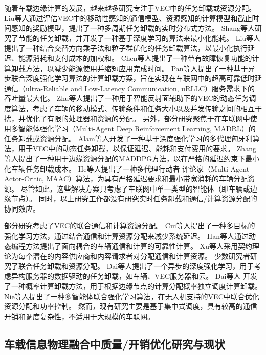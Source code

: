 随着车载边缘计算的发展，越来越多研究专注于VEC中的任务卸载或资源分配。
Liu等人\cite{liu2021rtds}通过评估VEC中的移动性感知的通信模型、资源感知的计算模型和截止时间感知的奖励模型，提出了一种多周期任务卸载的实时分布式方法。
Shang等人\cite{shang2021deep}研究了节能的任务卸载，并开发了一种基于深度学习的算法来最小化能耗。
Liu等人\cite{liu2022a}提出了一种结合交替方向乘子法和粒子群优化的任务卸载算法，以最小化执行延迟、能源消耗和支付成本的加权和。
Chen等人\cite{chen2020robust}提出了一种带有故障恢复功能的计算卸载方法，以减少能源使用并缩短应用完成时间。
Pan等人\cite{pan2022asynchronous}提出了一种基于异步联合深度强化学习算法的计算卸载方案，旨在实现在车联网中的超高可靠低时延通信（ultra-Reliable and Low-Latency Communication, uRLLC）服务需求下的吞吐量最大化。
Zhu等人\cite{zhu2022a}提出了一种用于智能反射面辅助下的VEC的动态任务调度算法，考虑了车辆的移动模式、传输条件和任务大小以及并发传输之间的相互干扰，并优化了有限的处理器和资源的分配。
另外，部分研究聚焦于在车联网中使用多智能体强化学习（Multi-Agent Deep Reinforcement Learning, MADRL）\cite{althamary2019a}的任务卸载或资源分配。
Alam等人\cite{alam2022multi}开发了一种基于深度强化学习的多代理匈牙利算法，用于VEC中的动态任务卸载，以保证延迟、能耗和支付费用的要求。
Zhang等人\cite{zhang2021adaptive}提出了一种用于边缘资源分配的MADDPG方法，以在严格的延迟约束下最小化车辆任务卸载成本。
He等人\cite{he2021efficient}提出了一种多代理行动者-评论家（Multi-Agent Actor-Critic, MAAC）算法，为具有严格延迟要求和最小带宽消耗的车辆分配资源。
尽管如此，这些解决方案只考虑了车联网中单一类型的智能体（即车辆或边缘节点）。
同时，以上研究工作都没有研究实时任务卸载和通信/计算资源分配的协同效应。

部分研究考虑了VEC的联合通信和计算资源分配。
Cui等人\cite{cui2021reinforcement}提出了一种多目标的强化学习方法，通过结合通信和计算资源分配来减少系统延迟。
Han等人\cite{han2020reliability}通过动态编程方法提出了面向耦合的车辆通信和计算的可靠性计算。
Xu等人\cite{xu2021socially}采用契约理论为每个潜在的内容供应商和内容请求者对分配通信和计算资源。
少数研究者研究了联合任务卸载和资源分配。
Dai等人\cite{dai2021asynchronous}提出了一个异步的深度强化学习，用于考虑异构服务器的数据驱动的任务卸载，如车辆、VEC服务器和云。
Dai等人 \cite{dai2022a}开发了一种概率计算卸载方法，用于根据边缘节点的计算分配概率独立调度计算卸载。
Nie等人\cite{nie2021semi}提出了一种多智能体联合强化学习算法，在无人机支持的VEC中联合优化资源分配和功率控制。
然而，现有研究主要是基于集中式调度，具有较高的通信开销和调度复杂性，不适用于大规模的车联网。

\subsection{车载信息物理融合中质量/开销优化研究与现状}

